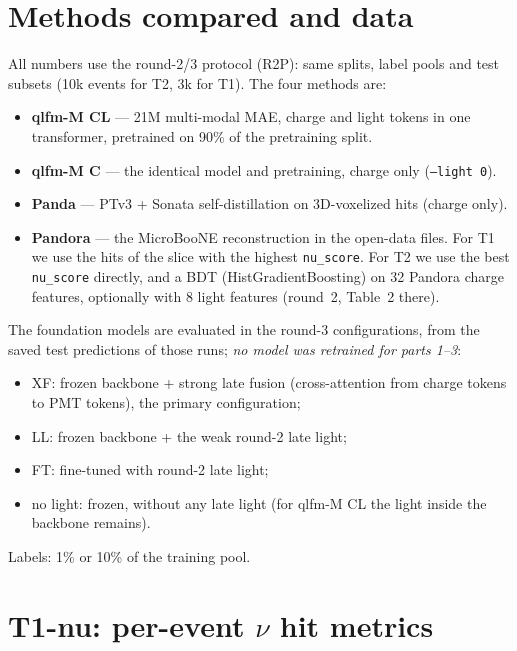 \documentclass[11pt,a4paper]{article}
\newcommand{\code}[1]{\texttt{\small #1}}
\begin{document}
\section{Methods compared and data}
All numbers use the round-2/3 protocol (R2P): same splits, label pools and test subsets (10k events for T2, 3k for T1). The four methods are:
\begin{itemize}
  \item \textbf{qlfm-M CL} --- 21M multi-modal MAE, charge and light tokens in one transformer, pretrained on 90\% of the pretraining split.
  \item \textbf{qlfm-M C} --- the identical model and pretraining, charge only (\code{--light 0}).
  \item \textbf{Panda} --- PTv3 + Sonata self-distillation on 3D-voxelized hits (charge only).
  \item \textbf{Pandora} --- the MicroBooNE reconstruction in the open-data files. For T1 we use the hits of the slice with the highest \code{nu\_score}. For T2 we use the best \code{nu\_score} directly, and a BDT (HistGradientBoosting) on 32 Pandora charge features, optionally with 8 light features (round~2, Table~2 there).
\end{itemize}
The foundation models are evaluated in the round-3 configurations, from the saved test predictions of those runs; \emph{no model was retrained for parts 1--3}:
\begin{itemize}
  \item XF: frozen backbone + strong late fusion (cross-attention from charge tokens to PMT tokens), the primary configuration;
  \item LL: frozen backbone + the weak round-2 late light;
  \item FT: fine-tuned with round-2 late light;
  \item no light: frozen, without any late light (for qlfm-M CL the light inside the backbone remains).
\end{itemize}
Labels: 1\% or 10\% of the training pool.

\section{T1-nu: per-event $\nu$ hit metrics}\label{sec:t1nu}
\end{document}
